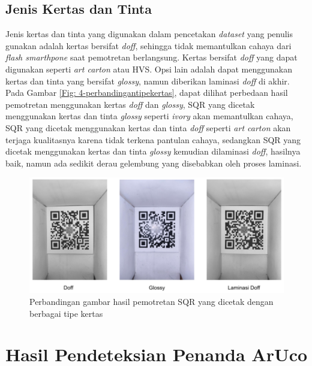\subsection{Jenis Kertas dan Tinta}
Jenis kertas dan tinta yang digunakan dalam pencetakan \emph{dataset} yang penulis gunakan adalah kertas bersifat \emph{doff}, sehingga tidak memantulkan
cahaya dari \emph{flash smarthpone} saat pemotretan berlangsung. Kertas bersifat \emph{doff} yang dapat digunakan seperti \emph{art carton} atau HVS. Opsi lain
adalah dapat menggunakan kertas dan tinta yang bersifat \emph{glossy}, namun diberikan laminasi \emph{doff} di akhir. Pada Gambar \ref{Fig:
	4-perbandingantipekertas}, dapat dilihat perbedaan hasil pemotretan menggunakan kertas \emph{doff} dan \emph{glossy}, SQR yang dicetak menggunakan kertas dan
tinta \emph{glossy} seperti \emph{ivory} akan memantulkan cahaya, SQR yang dicetak menggunakan kertas dan tinta \emph{doff} seperti \emph{art carton} akan
terjaga kualitasnya karena tidak terkena pantulan cahaya, sedangkan SQR yang dicetak menggunakan kertas dan tinta \emph{glossy} kemudian dilaminasi
\emph{doff}, hasilnya baik, namun ada sedikit derau gelembung yang disebabkan oleh proses laminasi.

\begin{figure}[h]
	\centering
	\includegraphics[width=15cm]{contents/chapter-4/4-perbandingankertas.png}
	\caption{Perbandingan gambar hasil pemotretan SQR yang dicetak dengan berbagai tipe kertas}
	\label{Fig: 4-perbandingankertas}
\end{figure}

\section{Hasil Pendeteksian Penanda ArUco}

